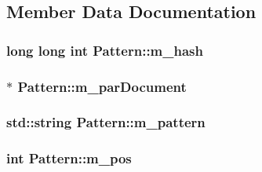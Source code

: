 \subsection{Member Data Documentation}
\subsubsection[{\texorpdfstring{m\_hash}{m_hash}}]{\setlength{\rightskip}{0pt plus 5cm}long long int Pattern::m\_hash\hspace{0.3cm}{\ttfamily [private]}}\hypertarget{class_pattern_ad2d90cf1c416dd89f29e7da860a02bfb}{}\label{class_pattern_ad2d90cf1c416dd89f29e7da860a02bfb}
\subsubsection[{\texorpdfstring{m\_parDocument}{m_parDocument}}]{$\ast$ Pattern::m\_parDocument\hspace{0.3cm}{\ttfamily [private]}}\hypertarget{class_pattern_a3ce8a1a5ba37412027278315935c06b8}{}\label{class_pattern_a3ce8a1a5ba37412027278315935c06b8}
\subsubsection[{\texorpdfstring{m\_pattern}{m_pattern}}]{\setlength{\rightskip}{0pt plus 5cm}std::string Pattern::m\_pattern\hspace{0.3cm}{\ttfamily [private]}}\hypertarget{class_pattern_a492ef4124f2dfebee1babe983cf3f726}{}\label{class_pattern_a492ef4124f2dfebee1babe983cf3f726}
\subsubsection[{\texorpdfstring{m\_pos}{m_pos}}]{\setlength{\rightskip}{0pt plus 5cm}int Pattern::m\_pos\hspace{0.3cm}{\ttfamily [private]}}\hypertarget{class_pattern_aa5b42830eafc550988e9156e4c370f67}{}\label{class_pattern_aa5b42830eafc550988e9156e4c370f67}
